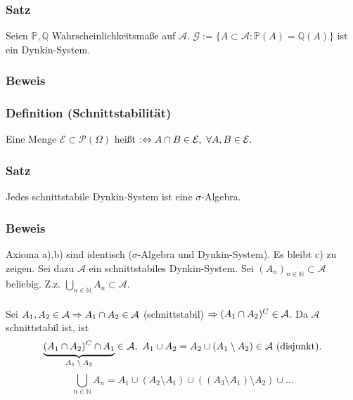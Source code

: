 \subsubsection{Satz}
Seien $\mathbb{P},\mathbb{Q}$ Wahrscheinlichkeitsma\ss{}e auf $\mathcal{A}$. $\mathcal{G}:=\{A\subset\mathcal{A}\colon\mathbb{P}(A)=\mathbb{Q}(A)\}$ ist ein Dynkin-System.
\subsubsection{Beweis}
\subsubsection{Definition (Schnittstabilit\"at)}
Eine Menge $\mathcal{E}\subset\mathcal{P}(\Omega)$ hei\ss{}t  $:\Leftrightarrow A\cap B\in\mathcal{E},\ \forall A,B\in\mathcal{E}.$
\subsubsection{Satz}
Jedes schnittstabile Dynkin-System ist eine $\sigma$-Algebra.
\subsubsection{Beweis}
Axioma a),b) sind identisch ($\sigma$-Algebra und Dynkin-System). Es bleibt c) zu zeigen. Sei dazu $\mathcal{A}$ ein schnittstabiles Dynkin-System. Sei $(A_n)_{n\in\mathbb{N}}\subset\mathcal{A}$ beliebig. Z.z. $\bigcup_{n\in\mathbb{N}}A_n\subset\mathcal{A}$.
\\~\\
Sei $A_1,A_2\in\mathcal{A}\Rightarrow A_1\cap A_2\in\mathcal{A}$ (schnittstabil) $\Rightarrow(A_1\cap A_2)^C\in\mathcal{A}$. Da $\mathcal{A}$ schnittstabil ist, ist
\[\ubr{(A_1\cap A_2)^C\cap A_1}{$A_1\setminus A_2$}\in\mathcal{A},\ A_1\cup A_2=A_2\cup(A_1\setminus A_2)\in\mathcal{A}\ \text{(disjunkt)}.\]
\[\bigcup_{n\in\mathbb{N}}A_n=A_1\cup(A_2\setminus A_1)\cup((A_3\setminus A_1)\setminus A_2)\cup\ldots\]
\myqed{}
